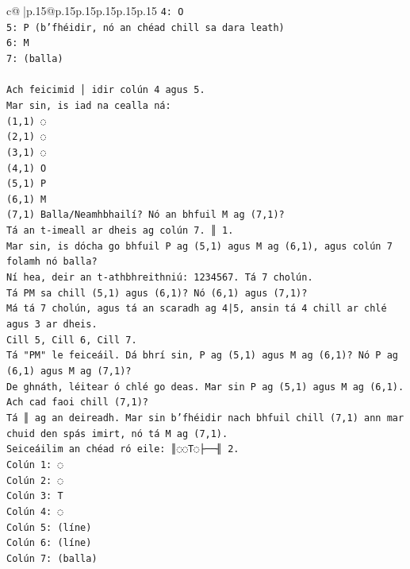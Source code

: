 \documentclass{article}
\begin{document}
{\begin{supertabular}{c@{$\;$}|p{.15\linewidth}@{}p{.15\linewidth}p{.15\linewidth}p{.15\linewidth}p{.15\linewidth}p{.15\linewidth}}
{{{\texttt{4: O} \\
\texttt{5: P (b'fhéidir, nó an chéad chill sa dara leath)} \\
\texttt{6: M} \\
\texttt{7: (balla)} \\
\\ 
\texttt{Ach feicimid │ idir colún 4 agus 5.} \\
\texttt{Mar sin, is iad na cealla ná:} \\
\texttt{(1,1) ◌} \\
\texttt{(2,1) ◌} \\
\texttt{(3,1) ◌} \\
\texttt{(4,1) O} \\
\texttt{(5,1) P} \\
\texttt{(6,1) M} \\
\texttt{(7,1) Balla/Neamhbhailí? Nó an bhfuil M ag (7,1)?} \\
\texttt{Tá an t{-}imeall ar dheis ag colún 7. ║ 1.} \\
\texttt{Mar sin, is dócha go bhfuil P ag (5,1) agus M ag (6,1), agus colún 7 folamh nó balla?} \\
\texttt{Ní hea, deir an t{-}athbhreithniú: 1234567. Tá 7 cholún.} \\
\texttt{Tá PM sa chill (5,1) agus (6,1)? Nó (6,1) agus (7,1)?} \\
\texttt{Má tá 7 cholún, agus tá an scaradh ag 4|5, ansin tá 4 chill ar chlé agus 3 ar dheis.} \\
\texttt{Cill 5, Cill 6, Cill 7.} \\
\texttt{Tá "PM" le feiceáil. Dá bhrí sin, P ag (5,1) agus M ag (6,1)? Nó P ag (6,1) agus M ag (7,1)?} \\
\texttt{De ghnáth, léitear ó chlé go deas. Mar sin P ag (5,1) agus M ag (6,1). Ach cad faoi chill (7,1)?} \\
\texttt{Tá ║ ag an deireadh. Mar sin b'fhéidir nach bhfuil chill (7,1) ann mar chuid den spás imirt, nó tá M ag (7,1).} \\
\texttt{Seiceáilim an chéad ró eile: ║◌◌T◌├──╢ 2.} \\
\texttt{Colún 1: ◌} \\
\texttt{Colún 2: ◌} \\
\texttt{Colún 3: T} \\
\texttt{Colún 4: ◌} \\
\texttt{Colún 5: (líne)} \\
\texttt{Colún 6: (líne)} \\
\texttt{Colún 7: (balla)} \\
}}}
\end{supertabular}}
\end{document}
